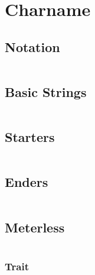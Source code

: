 \documentclass[main.tex]{subfiles}
\begin{document}
\chapter{Charname}

\section{Notation}
\begin{lstlisting}[language=FG]
\end{lstlisting}


\section{Basic Strings}

\begin{lstlisting}[language=FG]
\end{lstlisting}

\section{Starters}
\begin{lstlisting}[language=FG]

\end{lstlisting}

\section{Enders}

\begin{lstlisting}[language=FG]
\end{lstlisting}

\section{Meterless}


\begin{lstlisting}[language=FG]

\end{lstlisting}

\subsection{Trait}

\begin{lstlisting}[language=FG]

\end{lstlisting}
\end{document}
